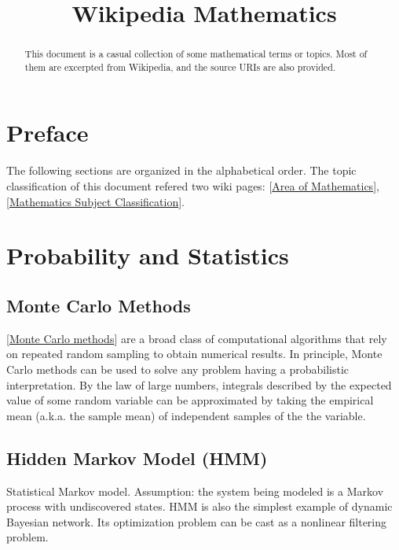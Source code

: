 \title{Wikipedia Mathematics}

\newcommand{\wiki}[1]{\href{https://en.wikipedia.org/wiki/#1}{}}

\begin{abstract}
This document is a casual collection of some mathematical terms or topics.
Most of them are excerpted from Wikipedia, and the source URIs are also
provided.
\end{abstract}

\section{Preface}

The following sections are organized in the alphabetical order. The topic
classification of this document refered two wiki pages:
[\href{https://en.wikipedia.org/wiki/Areas_of_mathematics}{Area of Mathematics}],
[\href{https://en.wikipedia.org/wiki/Mathematics_Subject_Classification}{Mathematics Subject Classification}].

\section{Probability and Statistics}

\subsection{Monte Carlo Methods}

[\href{https://en.wikipedia.org/wiki/Monte_Carlo_method}{Monte Carlo methods}]
are a broad class of computational algorithms that rely on repeated random
sampling to obtain numerical results. In principle, Monte Carlo methods can
be used to solve any problem having a probabilistic interpretation. By the
law of large numbers, integrals described by the expected value of some random
variable can be approximated by taking the empirical mean (a.k.a. the sample
mean) of independent samples of the the variable.

\subsection{Hidden Markov Model (HMM)}

Statistical Markov model. Assumption: the system being modeled is a Markov
process with undiscovered states. HMM is also the simplest example of dynamic
Bayesian network. Its optimization problem can be cast as a nonlinear filtering
problem.


